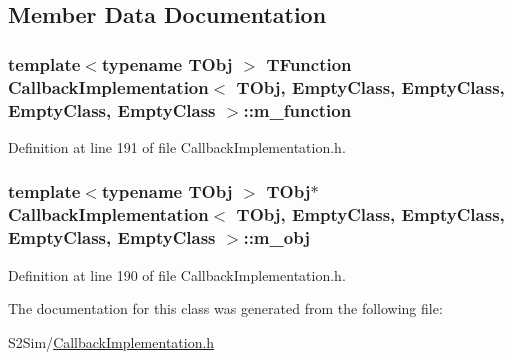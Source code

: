 \subsection{Member Data Documentation}
\hypertarget{class_callback_implementation_3_01_t_obj_00_01_empty_class_00_01_empty_class_00_01_empty_class_00_01_empty_class_01_4_a2089dd97f18a5aec58920e8b53c33056}{
\subsubsection[{m\-\_\-function}]{\setlength{\rightskip}{0pt plus 5cm}template$<$typename T\-Obj $>$ {\bf T\-Function} {\bf Callback\-Implementation}$<$ T\-Obj, {\bf Empty\-Class}, {\bf Empty\-Class}, {\bf Empty\-Class}, {\bf Empty\-Class} $>$\-::m\-\_\-function\hspace{0.3cm}{\ttfamily [private]}}}\label{class_callback_implementation_3_01_t_obj_00_01_empty_class_00_01_empty_class_00_01_empty_class_00_01_empty_class_01_4_a2089dd97f18a5aec58920e8b53c33056}


Definition at line 191 of file Callback\-Implementation.\-h.

\hypertarget{class_callback_implementation_3_01_t_obj_00_01_empty_class_00_01_empty_class_00_01_empty_class_00_01_empty_class_01_4_abca47b166a7dc66ab2bd6cf5a19b3f7e}{
\subsubsection[{m\-\_\-obj}]{\setlength{\rightskip}{0pt plus 5cm}template$<$typename T\-Obj $>$ T\-Obj$\ast$ {\bf Callback\-Implementation}$<$ T\-Obj, {\bf Empty\-Class}, {\bf Empty\-Class}, {\bf Empty\-Class}, {\bf Empty\-Class} $>$\-::m\-\_\-obj\hspace{0.3cm}{\ttfamily [private]}}}\label{class_callback_implementation_3_01_t_obj_00_01_empty_class_00_01_empty_class_00_01_empty_class_00_01_empty_class_01_4_abca47b166a7dc66ab2bd6cf5a19b3f7e}


Definition at line 190 of file Callback\-Implementation.\-h.



The documentation for this class was generated from the following file\-:\begin{DoxyCompactItemize}
\item 
S2\-Sim/\hyperlink{_callback_implementation_8h}{Callback\-Implementation.\-h}\end{DoxyCompactItemize}
